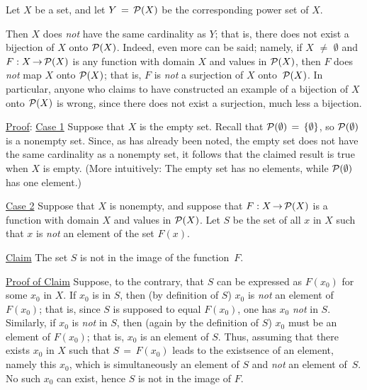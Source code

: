 {        Let $X$ be a set, and let $Y \,=\, {\cal P}(X)$ be the corresponding power set of $X$.

    Then $X$ does {\em not} have the same cardinality as $Y$; that is, there does not exist a bijection of $X$ onto ${\cal P}(X)$.
    Indeed, even more can be said; namely, if $X \,\,{\neq}\,\, {\emptyset}$ and $F:X \,{\rightarrow}\, {\cal P}(X)$ is any function with domain $X$ and values in ${\cal P}(X)$,
    then $F$ does {\em not} map $X$ onto ${\cal P}(X)$; that is, $F$ is {\em not} a surjection of $X$ onto~${\cal P}(X)$.
    In particular, anyone who claims to have constructed an example of a bijection of $X$ onto ${\cal P}(X)$ is wrong,
    since there does not exist a surjection, much less a bijection.

\V


        \underline{Proof}: \underline{Case 1} Suppose that $X$ is the empty set.
    Recall that ${\cal P}({\emptyset}) \,=\, \{{\emptyset}\}$, so ${\cal P}({\emptyset})$ is a nonempty set.
    Since, as has already been noted, the empty set does not have the same cardinality as a nonempty set,
    it follows that the claimed result is true when $X$ is empty. (More intuitively: The empty set has no elements, while ${\cal P}({\emptyset})$ has one element.)

\V

        \underline{Case 2} Suppose that $X$ is nonempty, and suppose that $F:X \,{\rightarrow}\, {\cal P}(X)$ is a function with domain $X$ and values in ${\cal P}(X)$.
    Let $S$ be the set of all $x$ in $X$ such that $x$ is {\em not} an element of the set $F(x)$.

        \h \underline{Claim} The set $S$ is not in the image of the function~$F$.

        \h \underline{Proof of Claim} Suppose, to the contrary, that $S$ can be expressed as $F(x_{0})$ for some $x_{0}$ in $X$.
    If $x_{0}$ is in $S$, then (by definition of $S$) $x_{0}$ is {\em not} an element of  $F(x_{0})$; that is, since $S$ is supposed to equal $F(x_{0})$, one has $x_{0}$ {\em not} in $S$.
    Similarly, if $x_{0}$ is {\em not} in $S$, then (again by the definition of $S$) $x_{0}$ must be an element of $F(x_{0})$; that is, $x_{0}$ is an element of $S$.
    Thus, assuming that there exists $x_{0}$ in $X$ such that $S \,=\, F(x_{0})$ leads to the existsence of an element, namely this $x_{0}$,
    which is simultaneously an element of $S$ and {\em not} an element of~$S$. No such $x_{0}$ can exist, hence $S$ is not in the image of $F$.


}
